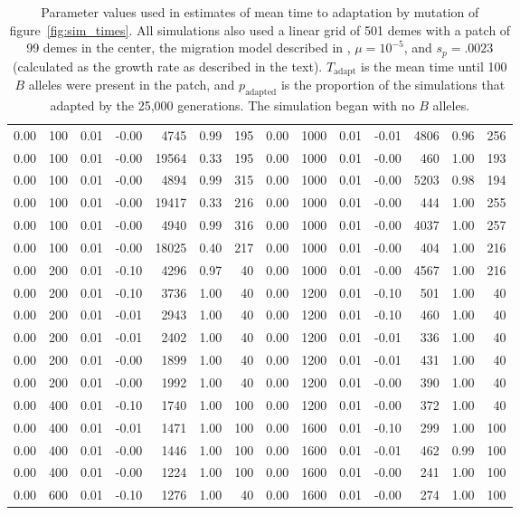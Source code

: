 \begin{table}[ht]
{\begin{tabular}{|rrrrrrr||rrrrrrr|}
  0.00 & 100 & 0.01 & -0.00 & 4745 & 0.99 & 195 & 0.00 & 1000 & 0.01 & -0.01 & 4806 & 0.96 & 256 \\ 
  0.00 & 100 & 0.01 & -0.00 & 19564 & 0.33 & 195 & 0.00 & 1000 & 0.01 & -0.00 & 460 & 1.00 & 193 \\ 
  0.00 & 100 & 0.01 & -0.00 & 4894 & 0.99 & 315 & 0.00 & 1000 & 0.01 & -0.00 & 5203 & 0.98 & 194 \\ 
  0.00 & 100 & 0.01 & -0.00 & 19417 & 0.33 & 216 & 0.00 & 1000 & 0.01 & -0.00 & 444 & 1.00 & 255 \\ 
  0.00 & 100 & 0.01 & -0.00 & 4940 & 0.99 & 316 & 0.00 & 1000 & 0.01 & -0.00 & 4037 & 1.00 & 257 \\ 
  0.00 & 100 & 0.01 & -0.00 & 18025 & 0.40 & 217 & 0.00 & 1000 & 0.01 & -0.00 & 404 & 1.00 & 216 \\ 
  0.00 & 200 & 0.01 & -0.10 & 4296 & 0.97 & 40 & 0.00 & 1000 & 0.01 & -0.00 & 4567 & 1.00 & 216 \\ 
  0.00 & 200 & 0.01 & -0.10 & 3736 & 1.00 & 40 & 0.00 & 1200 & 0.01 & -0.10 & 501 & 1.00 & 40 \\ 
  0.00 & 200 & 0.01 & -0.01 & 2943 & 1.00 & 40 & 0.00 & 1200 & 0.01 & -0.10 & 460 & 1.00 & 40 \\ 
  0.00 & 200 & 0.01 & -0.01 & 2402 & 1.00 & 40 & 0.00 & 1200 & 0.01 & -0.01 & 336 & 1.00 & 40 \\ 
  0.00 & 200 & 0.01 & -0.00 & 1899 & 1.00 & 40 & 0.00 & 1200 & 0.01 & -0.01 & 431 & 1.00 & 40 \\ 
  0.00 & 200 & 0.01 & -0.00 & 1992 & 1.00 & 40 & 0.00 & 1200 & 0.01 & -0.00 & 390 & 1.00 & 40 \\ 
  0.00 & 400 & 0.01 & -0.10 & 1740 & 1.00 & 100 & 0.00 & 1200 & 0.01 & -0.00 & 372 & 1.00 & 40 \\ 
  0.00 & 400 & 0.01 & -0.01 & 1471 & 1.00 & 100 & 0.00 & 1600 & 0.01 & -0.10 & 299 & 1.00 & 100 \\ 
  0.00 & 400 & 0.01 & -0.00 & 1446 & 1.00 & 100 & 0.00 & 1600 & 0.01 & -0.01 & 462 & 0.99 & 100 \\ 
  0.00 & 400 & 0.01 & -0.00 & 1224 & 1.00 & 100 & 0.00 & 1600 & 0.01 & -0.00 & 241 & 1.00 & 100 \\ 
  0.00 & 600 & 0.01 & -0.10 & 1276 & 1.00 & 40 & 0.00 & 1600 & 0.01 & -0.00 & 274 & 1.00 & 100 \\ 
   \hline
\end{tabular}
}
\caption{
            Parameter values used in estimates of mean time to adaptation by mutation of figure~\ref{fig:sim_times}.
            All simulations also used a linear grid of 501 demes with a patch of 99 demes in the center, 
            the migration model described in ,
            $\mu=10^{-5}$, and $s_p=.0023$ (calculated as the growth rate as described in the text).
            $T_\text{adapt}$ is the mean time until 100 $B$ alleles were present in the patch,
            and $p_\text{adapted}$ is the proportion of the simulations that adapted by the 25,000 generations.
            The simulation began with no $B$ alleles.
            } 
\label{stab:mutation_params}
\end{table}
